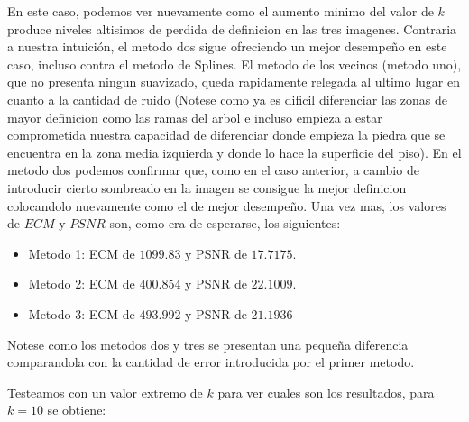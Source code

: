 En este caso, podemos ver nuevamente como el aumento minimo del valor de $k$ produce niveles altisimos de perdida de definicion en las tres imagenes. Contraria a nuestra intuición, el metodo dos sigue ofreciendo un mejor desempeño en este caso, incluso contra el metodo de Splines. El metodo de los vecinos (metodo uno), que no presenta ningun suavizado, queda rapidamente relegada al ultimo lugar en cuanto a la cantidad de ruido (Notese como ya es dificil diferenciar las zonas de mayor definicion como las ramas del arbol e incluso empieza a estar comprometida nuestra capacidad de diferenciar donde empieza la piedra que se encuentra en la zona media izquierda y donde lo hace la superficie del piso). En el metodo dos podemos confirmar que, como en el caso anterior, a cambio de introducir cierto sombreado en la imagen se consigue la mejor definicion colocandolo nuevamente como el de mejor desempeño.
Una vez mas, los valores de $ECM$ y $PSNR$ son, como era de esperarse, los siguientes:
\begin{itemize}
 \item Metodo 1: ECM de $1099.83$ y PSNR de $17.7175$.
 \item Metodo 2: ECM de $400.854$ y PSNR de $22.1009$.
 \item Metodo 3: ECM de $493.992$ y PSNR de $21.1936$
\end{itemize}
Notese como los metodos dos y tres se presentan una pequeña diferencia comparandola con la cantidad de error introducida por el primer metodo.

Testeamos con un valor extremo de $k$ para ver cuales son los resultados, para $k=10$ se obtiene:


